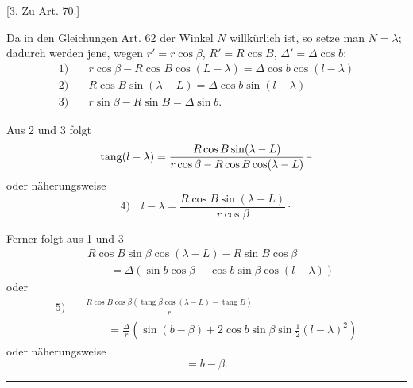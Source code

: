 \begin{center}
[3. Zu Art. 70.]
\end{center}
Da in den Gleichungen Art. 62 der Winkel \(N\) willkürlich ist, so setze man \(N=\lambda\); dadurch werden jene, wegen \(r'=r\cos\beta\), \(R'=R\cos B\), \(\Delta'=\Delta\cos b\):
\[
\begin{aligned}
1)\quad&r\cos\beta-R\cos B\cos(L-\lambda)=\Delta\cos b\cos(l-\lambda)\\
2)\quad&R\cos B\sin(\lambda-L)=\Delta\cos b\sin(l-\lambda)\\
3)\quad&r\sin\beta-R\sin B=\Delta\sin b.
\end{aligned}
\]

Aus 2 und 3 folgt
\[
\operatorname{tang}(l-\lambda)=\frac{R\cos B\sin(\lambda-L)}{r\cos\beta-R\cos B\cos(\lambda-L)}\,\mathpunct{\vcenter{\hbox{\rule{.45em}{.35pt}}}}
\]
oder näherungsweise
\[
4)\quad l-\lambda=\frac{R\cos B\sin(\lambda-L)}{r\cos\beta}\mathpunct{\cdot}
\]

Ferner folgt aus 1 und 3
\[
\begin{aligned}
&R\cos B\sin\beta\cos(\lambda-L)-R\sin B\cos\beta\\
&\qquad=\Delta(\sin b\cos\beta-\cos b\sin\beta\cos(l-\lambda))
\end{aligned}
\]
oder
\[
\begin{aligned}
5)\quad&\frac{R\cos B\cos\beta(\operatorname{tang}\beta\cos(\lambda-L)-\operatorname{tang}B)}{r}\\
&\qquad=\frac{\Delta}{r}(\sin(b-\beta)+2\cos b\sin\beta\sin\tfrac12(l-\lambda)^2)
\end{aligned}
\]
oder näherungsweise
\[
=b-\beta.
\]
\begin{center}\rule{.18\textwidth}{.35pt}\end{center}

